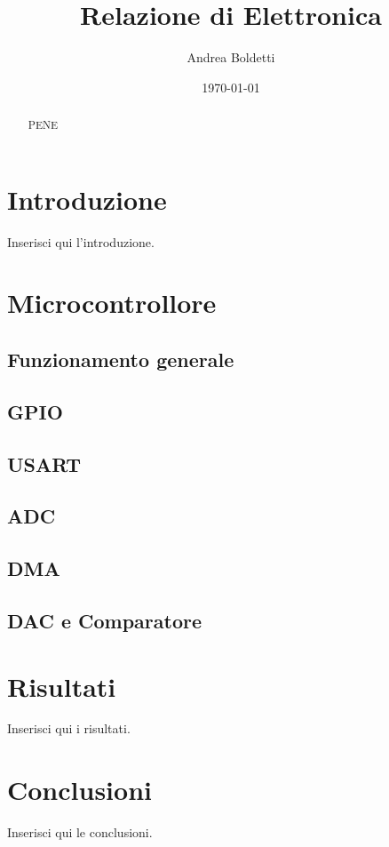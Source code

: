 \documentclass[a4paper,12pt]{article}
\title{Relazione di Elettronica}
\author{Andrea Boldetti}
\date{\today}
\begin{document}
\maketitle

\begin{abstract}

PENE

\end{abstract}

\newpage
\tableofcontents

\section{Introduzione}
Inserisci qui l'introduzione.

\section{Microcontrollore}
\subsection{Funzionamento generale}

\subsection{GPIO}

\subsection{USART}

\subsection{ADC}

\subsection{DMA}

\subsection{DAC e Comparatore}



\section{Risultati}
Inserisci qui i risultati.

\section{Conclusioni}
Inserisci qui le conclusioni.
\end{document}

